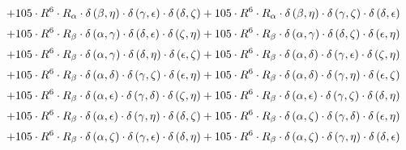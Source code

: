 \begin{subequations}
\begin{gather}
 \\[0.2em] \notag 		 + 105 \cdot R^{6} \cdot R_{\alpha{}} \cdot \delta{}\left(\beta{}, \eta{}\right) \cdot \delta{}\left(\gamma{}, \epsilon{}\right) \cdot \delta{}\left(\delta{}, \zeta{}\right)+ 105 \cdot R^{6} \cdot R_{\alpha{}} \cdot \delta{}\left(\beta{}, \eta{}\right) \cdot \delta{}\left(\gamma{}, \zeta{}\right) \cdot \delta{}\left(\delta{}, \epsilon{}\right) 
 \\[0.2em] \notag 		 + 105 \cdot R^{6} \cdot R_{\beta{}} \cdot \delta{}\left(\alpha{}, \gamma{}\right) \cdot \delta{}\left(\delta{}, \epsilon{}\right) \cdot \delta{}\left(\zeta{}, \eta{}\right)+ 105 \cdot R^{6} \cdot R_{\beta{}} \cdot \delta{}\left(\alpha{}, \gamma{}\right) \cdot \delta{}\left(\delta{}, \zeta{}\right) \cdot \delta{}\left(\epsilon{}, \eta{}\right) 
 \\[0.2em] \notag 		 + 105 \cdot R^{6} \cdot R_{\beta{}} \cdot \delta{}\left(\alpha{}, \gamma{}\right) \cdot \delta{}\left(\delta{}, \eta{}\right) \cdot \delta{}\left(\epsilon{}, \zeta{}\right)+ 105 \cdot R^{6} \cdot R_{\beta{}} \cdot \delta{}\left(\alpha{}, \delta{}\right) \cdot \delta{}\left(\gamma{}, \epsilon{}\right) \cdot \delta{}\left(\zeta{}, \eta{}\right) 
 \\[0.2em] \notag 		 + 105 \cdot R^{6} \cdot R_{\beta{}} \cdot \delta{}\left(\alpha{}, \delta{}\right) \cdot \delta{}\left(\gamma{}, \zeta{}\right) \cdot \delta{}\left(\epsilon{}, \eta{}\right)+ 105 \cdot R^{6} \cdot R_{\beta{}} \cdot \delta{}\left(\alpha{}, \delta{}\right) \cdot \delta{}\left(\gamma{}, \eta{}\right) \cdot \delta{}\left(\epsilon{}, \zeta{}\right) 
 \\[0.2em] \notag 		 + 105 \cdot R^{6} \cdot R_{\beta{}} \cdot \delta{}\left(\alpha{}, \epsilon{}\right) \cdot \delta{}\left(\gamma{}, \delta{}\right) \cdot \delta{}\left(\zeta{}, \eta{}\right)+ 105 \cdot R^{6} \cdot R_{\beta{}} \cdot \delta{}\left(\alpha{}, \epsilon{}\right) \cdot \delta{}\left(\gamma{}, \zeta{}\right) \cdot \delta{}\left(\delta{}, \eta{}\right) 
 \\[0.2em] \notag 		 + 105 \cdot R^{6} \cdot R_{\beta{}} \cdot \delta{}\left(\alpha{}, \epsilon{}\right) \cdot \delta{}\left(\gamma{}, \eta{}\right) \cdot \delta{}\left(\delta{}, \zeta{}\right)+ 105 \cdot R^{6} \cdot R_{\beta{}} \cdot \delta{}\left(\alpha{}, \zeta{}\right) \cdot \delta{}\left(\gamma{}, \delta{}\right) \cdot \delta{}\left(\epsilon{}, \eta{}\right) 
 \\[0.2em] \notag 		 + 105 \cdot R^{6} \cdot R_{\beta{}} \cdot \delta{}\left(\alpha{}, \zeta{}\right) \cdot \delta{}\left(\gamma{}, \epsilon{}\right) \cdot \delta{}\left(\delta{}, \eta{}\right)+ 105 \cdot R^{6} \cdot R_{\beta{}} \cdot \delta{}\left(\alpha{}, \zeta{}\right) \cdot \delta{}\left(\gamma{}, \eta{}\right) \cdot \delta{}\left(\delta{}, \epsilon{}\right) 

\end{gather}
\end{subequations}
